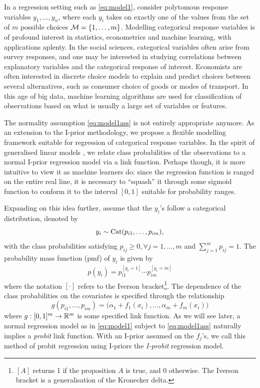 \documentclass[a4paper,showframe,11pt]{report}
\begin{document}

In a regression setting such as \cref{eq:model1}, consider polytomous response variables $y_1,\dots,y_n$, where each $y_i$ takes on exactly one of the values from the set of $m$ possible choices ${\mathcal M} = \{1,\dots,m\}$.
Modelling categorical response variables is of profound interest in statistics, econometrics and machine learning, with applications aplenty. 
In the social sciences, categorical variables often arise from survey responses, and one may be interested in studying correlations between  explanatory variables and the categorical response of interest.
Economists are often interested in discrete choice models to explain and predict choices between several alternatives, such as consumer choice of goods or modes of transport.
In this age of big data, machine learning algorithms are used for classification of observations based on what is usually a large set of variables or features.

The normality assumption \cref{eq:model1ass} is not entirely appropriate anymore.
As an extension to the I-prior methodology, we propose a flexible modelling framework suitable for regression of categorical response variables.
In the spirit of generalised linear models \citep{mccullagh1989}, we relate class probabilities of the observations to a normal I-prior regression model via a link function.
Perhaps though, it is more intuitive to view it as machine learners do: since the regression function is ranged on the entire real line, it is necessary to ``squash'' it through some sigmoid function to conform it to the interval $[0,1]$ suitable for probability ranges.

Expanding on this idea further, assume that the $y_i$'s follow a categorical distribution, denoted by
\[
  y_i \sim \operatorname{Cat}(p_{i1},\dots,p_{im}),
\]
with the class probabilities satisfying $p_{ij} \geq 0, \forall j=1,\dots,m$ and $\sum_{j=1}^m p_{ij} = 1$. 
The probability mass function (pmf) of $y_i$ is given by
\begin{align*}%
  p(y_i) = p_{i1}^{[y_i = 1]} \cdots p_{im}^{[y_i = m]}
\end{align*}
where the notation $[\cdot]$ refers to the Iverson bracket\footnote{$[A]$ returns 1 if the proposition $A$ is true, and 0 otherwise. The Iverson bracket is a generalisation of the Kronecker delta.}. 
The dependence of the class probabilities on the covariates is specified through the relationship
\[
  g(p_{i1},\dots,p_{im}) = \big(\alpha_1 + f_1(x_i), \dots, \alpha_m + f_m(x_i)\big)
\]
where $g:[0,1]^m\to\mathbb{R}^m$ is some specified link function.
As we will see later, a normal regression model as in \cref{eq:model1} subject to \cref{eq:model1ass} naturally implies a \emph{probit} link function.
With an I-prior assumed on the $f_j$'s, we call this method of probit regression using I-priors the \emph{I-probit} regression model.
\end{document}
